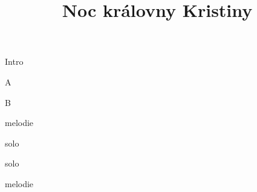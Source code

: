 \documentclass[timestamp]{jazzgrid}
\title{Noc královny Kristiny}
\begin{document}
\maketitle

\begin{musicsection}{Intro}
\barline
	{}
	{}
	{}
	{}
\end{musicsection}

\begin{musicsection}{A}
\barline
	{}
	{}
	{}
	{}
\barline
	{}
	{}
	{}
	{}
\barline
	{}
	{}
	{}
	{}
\barline
	{}
	{}
	{}
	{}
\end{musicsection}

\begin{musicsection}{B}
\barline
	{}
	{}
	{}
	{}
	{}
	{}
	{}
\end{musicsection}

\footnotesize
\begin{description}[noitemsep,align=right,labelwidth=\widthof{\bfseries{Intro}}]
	\item [Intro]
	\item [AAB] melodie
	\item [Intro]
	\item [AAB] solo
	\item [Intro]
	\item [AAB] solo
	\item [Intro]
	\item [AAB] melodie
	\item [Intro]
\end{description}
\end{document}

